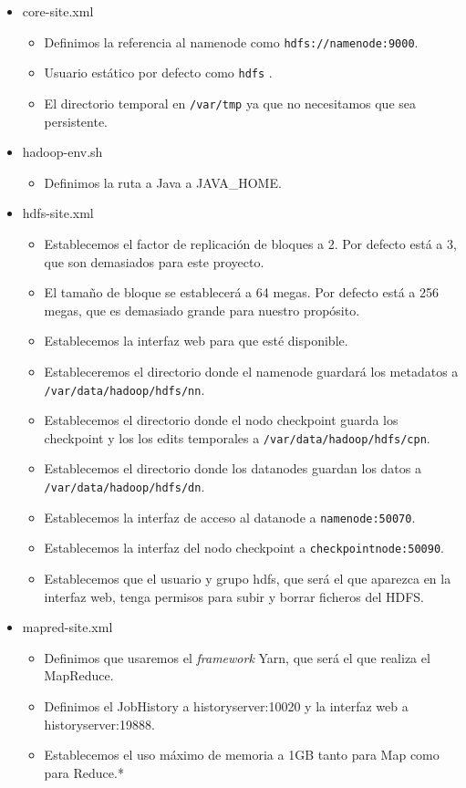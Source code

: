 \begin{itemize}
\item core-site.xml
  \begin{itemize}
  \item Definimos la referencia al namenode como {\tt hdfs://namenode:9000}.
  \item Usuario estático por defecto como {\tt hdfs} .
  \item El directorio temporal en {\tt /var/tmp} ya que no necesitamos que sea
    persistente.
  \end{itemize}

\item hadoop-env.sh
  \begin{itemize}
  \item Definimos la ruta a Java a JAVA\_HOME.
  \end{itemize}

\item hdfs-site.xml
  \begin{itemize}
  \item Establecemos el factor de replicación de bloques a 2. Por defecto
    está a 3, que son demasiados para este proyecto.
  \item El tamaño de bloque se establecerá a 64 megas. Por defecto está a
    256 megas, que es demasiado grande para nuestro propósito.
  \item Establecemos la interfaz web para que esté disponible.
  \item Estableceremos el directorio donde el namenode guardará los
    metadatos a {\tt /var/data/hadoop/hdfs/nn}.
  \item Establecemos el directorio donde el nodo checkpoint guarda los
    checkpoint y los los edits temporales a {\tt /var/data/hadoop/hdfs/cpn}.
  \item Establecemos el directorio donde los datanodes guardan los datos a
    {\tt /var/data/hadoop/hdfs/dn}.
  \item Establecemos la interfaz de acceso al datanode a {\tt namenode:50070}.
  \item Establecemos la interfaz del nodo checkpoint a
    {\tt checkpointnode:50090}.
  \item Establecemos que el usuario y grupo hdfs, que será el que aparezca
    en la interfaz web, tenga permisos para subir y borrar ficheros del
    HDFS.
  \end{itemize}

\item mapred-site.xml
  \begin{itemize}
  \item Definimos que usaremos el \emph{framework} Yarn, que será el que realiza
    el MapReduce.
  \item Definimos el JobHistory a historyserver:10020 y la interfaz web a
    historyserver:19888.
  \item Establecemos el uso máximo de memoria a 1GB tanto para Map como
    para Reduce.*
  \end{itemize}


\end{itemize}
